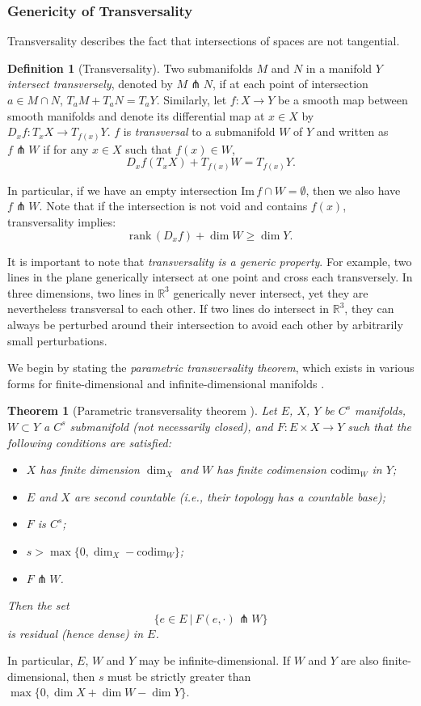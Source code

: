 \documentclass[11pt]{article}
\newcommand{\R}{\mathbb{R}}
\newcommand{\inter}{\cap}
\renewcommand{\Im}{\mathrm{Im} \,}
\newcommand{\rank}{\mathrm{rank} \,}
\theoremstyle{plain}
\newtheorem{thm}{Theorem}
\theoremstyle{definition}
\newtheorem{defi}{Definition}
\theoremstyle{remark}
\begin{document}
\subsubsection{Genericity of Transversality}
Transversality describes the fact that intersections of spaces are not tangential. 

\begin{defi}[Transversality]
Two submanifolds $M$ and $N$ in a manifold $Y$ \textit{intersect transversely}, denoted by $M \pitchfork N$, if at each point of intersection $a \in M \inter N$, $T_a M + T_a N = T_a Y$. Similarly, let $f : X \to Y$ be a smooth map between smooth manifolds and denote its differential map at $x \in X$ by $D_x f : T_x X \to T_{f(x)} Y$. $f$ is \textit{transversal} to a submanifold $W$ of $Y$ and written as $f \pitchfork W$ if for any $x \in X$ such that $f(x) \in W$, 
\[D_x f(T_x X) + T_{f(x)} W = T_{f(x)} Y .\]
\end{defi}
In particular, if we have an empty intersection $\Im f \inter W = \emptyset$, then we also have $f \pitchfork W$.
Note that if the intersection is not void and contains $f(x)$, transversality implies:
\[\rank(D_x f) + \dim W \geq \dim Y. \]


It is important to note that \textit{transversality is a generic property}. For example, two lines in the plane generically intersect  at one point and cross each transversely. In three dimensions, two lines in $\R^3$ generically never intersect, yet they are nevertheless transversal to each other. If two lines do intersect in $\R^3$, they can always be perturbed around their intersection to avoid each other by arbitrarily small perturbations.

We begin by stating the \textit{parametric transversality theorem}, which exists in various forms for finite-dimensional \citep{hirsch_differential_1976} and infinite-dimensional manifolds \citep{abraham_transversal_1967}.

\begin{thm}[Parametric transversality theorem \citep{abraham_transversal_1967}]
	\label{thm:param_trans}
Let $E$, $X$, $Y$ be $C^s$ manifolds, $W \subset Y$ a $C^s$ submanifold (not necessarily closed), and $F : E \times X \to Y$ such that the following conditions are satisfied:
\begin{itemize}
\item $X$ has finite dimension $\dim_X$ and $W$ has finite codimension $\mathrm{codim}_W$ in $Y$;
\item $E$ and $X$ are second countable (i.e., their topology has a countable base);
\item $F$ is $C^s$;
\item $s > \max \{ 0, \dim_X - \mathrm{codim}_W\}$;
\item $F \pitchfork W$.
\end{itemize}
Then the set
\[ \{e \in E ~|~ F(e, \cdot) \pitchfork W \} \]
is residual (hence dense) in $E$.
\end{thm}
In particular, $E$, $W$ and $Y$ may be infinite-dimensional.
If $W$ and $Y$ are also finite-dimensional, then $s$ must be strictly greater than $\max \{ 0, \dim X + \dim W - \dim Y \}$.
\end{document}
